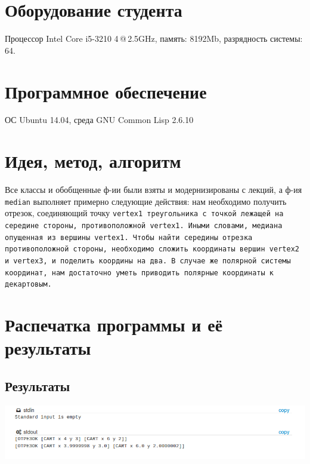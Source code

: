\documentclass[12pt]{article}
\begin{document}
\section{Оборудование студента}
Процессор Intel Core i5-3210 4\,@\,2.5GHz, память: 8192Mb, разрядность системы: 64.

\section{Программное обеспечение}
ОС Ubuntu 14.04, среда GNU Common Lisp 2.6.10

\section{Идея, метод, алгоритм}
Все классы и обобщенные ф-ии были взяты и модернизированы с лекций, а ф-ия {\color{red}\tt{median}} выполняет примерно следующие действия: нам необходимо получить отрезок, соединяющий точку \tt{vertex1} треугольника с точкой лежащей на середине стороны, противоположной \tt{vertex1}. Иными словами, медиана опущенная из вершины \tt{vertex1}. Чтобы найти середины отрезка противоположной стороны, необходимо сложить координаты вершин \tt{vertex2} и \tt{vertex3}, и поделить координы на два. В случае же полярной системы координат, нам достаточно уметь приводить полярные координаты к декартовым.
\section{Распечатка программы и её результаты}

\subsection{Результаты}
\includegraphics[scale=0.7]{lr5Screen}

%
\end{document}
